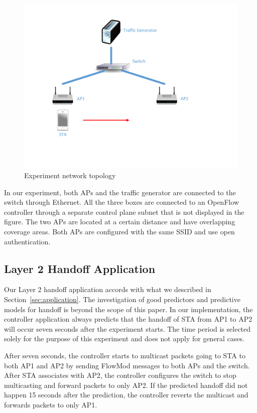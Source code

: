 \begin{figure}
\centering
\includegraphics[trim=1.25in 1.5in 2in 0.5in, clip, width=.6\textwidth]{figures/topology}
\caption{Experiment network topology}
\label{fig:topology}
\end{figure}

In our experiment, both APs and the traffic generator are connected to the switch
through  Ethernet. All the three boxes are connected to an OpenFlow
controller through a separate control plane subnet that is not displayed in the
figure.  The two APs are located at a certain distance and have overlapping coverage areas.  Both APs are configured with
the same SSID and use open authentication. 

\subsection{Layer 2 Handoff Application}
Our Layer 2 handoff application accords with what we described in
Section~\ref{sec:application}. The investigation of good
predictors and predictive models for handoff is beyond the scope of this paper.
In our implementation, the controller application always predicts that the
handoff of STA from AP1 to AP2 will occur seven seconds after the experiment starts.
The time period is selected solely for the purpose of this experiment and
does not apply for general cases. 
 
After seven seconds, the controller starts to multicast packets going to STA to both
AP1 and AP2 by sending FlowMod messages to both APs and the switch. After STA
associates with AP2, the controller configures the switch to stop multicasting
and forward packets to only AP2. If the predicted handoff did not happen 15
seconds after the prediction, the controller reverts the multicast and forwards
packets to only AP1.


